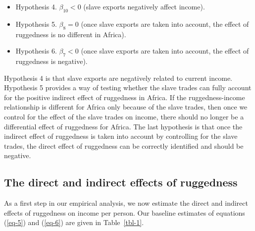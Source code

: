 \documentclass[
  letterpaper,
  DIV=11,
  numbers=noendperiod]{scrartcl}
\providecommand{\tightlist}{%
  \setlength{\itemsep}{0pt}\setlength{\parskip}{0pt}}
\begin{document}
\begin{itemize}
\tightlist
\item
  Hypothesis 4. \(\beta_{10} < 0\) (slave exports negatively affect
  income).
\item
  Hypothesis 5. \(\beta_8 = 0\) (once slave exports are taken into
  account, the effect of ruggedness is no different in Africa).
\item
  Hypothesis 6. \(\beta_7 < 0\) (once slave exports are taken into
  account, the effect of ruggedness is negative).
\end{itemize}

Hypothesis 4 is that slave exports are negatively related to current
income. Hypothesis 5 provides a way of testing whether the slave trades
can fully account for the positive indirect effect of ruggedness in
Africa. If the ruggedness-income relationship is different for Africa
only because of the slave trades, then once we control for the effect of
the slave trades on income, there should no longer be a differential
effect of ruggedness for Africa. The last hypothesis is that once the
indirect effect of ruggedness is taken into account by controlling for
the slave trades, the direct effect of ruggedness can be correctly
identified and should be negative.

\subsection{The direct and indirect effects of ruggedness}\label{sec-4}

As a first step in our empirical analysis, we now estimate the direct
and indirect effects of ruggedness on income per person. Our baseline
estimates of equations (\ref{eq-5}) and (\ref{eq-6}) are given in
Table~\ref{tbl-1}.
\end{document}
